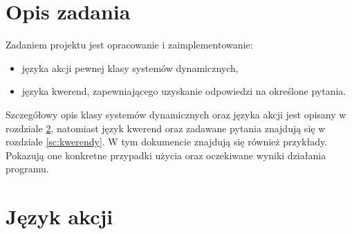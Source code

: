 

\maketitle
\tableofcontents

\newpage

\section{Opis zadania}
Zadaniem projektu jest opracowanie i zaimplementowanie:
\begin{itemize}
\item języka akcji pewnej klasy systemów dynamicznych,
\item języka kwerend, zapewniającego uzyskanie odpowiedzi na określone pytania.
\end{itemize}
Szczegółowy opis klasy systemów dynamicznych oraz języka akcji jest opisany w rozdziale \ref{sc:jezyk_akcji},
natomiast język kwerend oraz zadawane pytania znajdują się w rozdziale \ref{sc:kwerendy}.
W tym dokumencie znajdują się również przykłady.
Pokazują one konkretne przypadki użycia oraz oczekiwane wyniki działania programu.

\section{Język akcji}\label{sc:jezyk_akcji}

